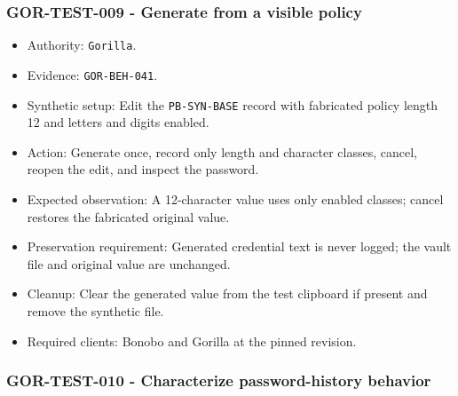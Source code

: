 \documentclass[
  letterpaper,
]{article}
\newcommand{\passthrough}[1]{#1}
\providecommand{\tightlist}{%
  \setlength{\itemsep}{0pt}\setlength{\parskip}{0pt}}
\begin{document}
\subsubsection{GOR-TEST-009 - Generate from a visible policy}\label{gor-test-009---generate-from-a-visible-policy}

\begin{itemize}
\tightlist
\item
  Authority: \passthrough{\lstinline!Gorilla!}.
\item
  Evidence: \nolinkurl{GOR-BEH-041}.
\item
  Synthetic setup: Edit the \nolinkurl{PB-SYN-BASE} record with fabricated policy length 12 and letters and digits
  enabled.
\item
  Action: Generate once, record only length and character classes, cancel, reopen the edit, and inspect the password.
\item
  Expected observation: A 12-character value uses only enabled classes; cancel restores the fabricated original value.
\item
  Preservation requirement: Generated credential text is never logged; the vault file and original value are unchanged.
\item
  Cleanup: Clear the generated value from the test clipboard if present and remove the synthetic file.
\item
  Required clients: Bonobo and Gorilla at the pinned revision.
\end{itemize}

\subsubsection{GOR-TEST-010 - Characterize password-history
behavior}\label{gor-test-010---characterize-password-history-behavior}
\end{document}
